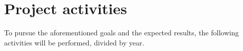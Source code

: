 \documentclass[12pt,a4paper]{article}
\begin{document}






\section{Project activities}\label{sec:activities}

To pursue the aforementioned goals and the expected results,
the following activities will be performed,
divided by year.
\end{document}

